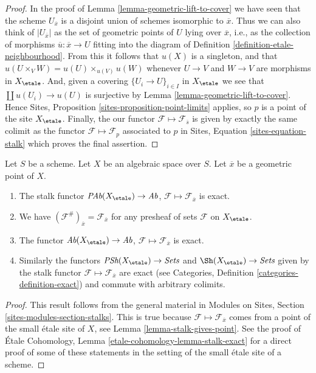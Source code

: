 \begin{proof}
In the proof of
Lemma \ref{lemma-geometric-lift-to-cover}
we have seen that the scheme $U_{\overline{x}}$ is a disjoint union of
schemes isomorphic to $\overline{x}$. Thus we can also think of
$|U_{\overline{x}}|$ as the set of geometric points of $U$ lying over
$\overline{x}$, i.e., as the collection of morphisms
$\overline{u} : \overline{x} \to U$ fitting into the diagram of
Definition \ref{definition-etale-neighbourhood}.
From this it follows that $u(X)$ is a singleton, and that
$u(U \times_V W) = u(U) \times_{u(V)} u(W)$
whenever $U \to V$ and $W \to V$ are morphisms in $X_\etale$.
And, given a covering $\{U_i \to U\}_{i \in I}$ in $X_\etale$ we see
that $\coprod u(U_i) \to u(U)$ is surjective by
Lemma \ref{lemma-geometric-lift-to-cover}.
Hence
Sites, Proposition \ref{sites-proposition-point-limits}
applies, so $p$ is a point of the site $X_\etale$.
Finally, the our functor $\mathcal{F} \mapsto \mathcal{F}_{\overline{s}}$
is given by exactly the same colimit as the functor
$\mathcal{F} \mapsto \mathcal{F}_p$ associated to $p$ in
Sites, Equation \ref{sites-equation-stalk}
which proves the final assertion.
\end{proof}

\begin{lemma}
\label{lemma-stalk-exact}
Let $S$ be a scheme.
Let $X$ be an algebraic space over $S$.
Let $\overline{x}$ be a geometric point of $X$.
\begin{enumerate}
\item The stalk functor
$\textit{PAb}(X_\etale) \to \textit{Ab}$,
$\mathcal{F}  \mapsto  \mathcal{F}_{\overline{x}}$
is exact.
\item We have $(\mathcal{F}^\#)_{\overline{x}} = \mathcal{F}_{\overline{x}}$
for any presheaf of sets $\mathcal{F}$ on $X_\etale$.
\item The functor
$\textit{Ab}(X_\etale) \to \textit{Ab}$,
$\mathcal{F} \mapsto \mathcal{F}_{\overline{x}}$ is exact.
\item Similarly the functors
$\textit{PSh}(X_\etale) \to \textit{Sets}$ and
$\Sh(X_\etale) \to \textit{Sets}$ given by the stalk functor
$\mathcal{F} \mapsto \mathcal{F}_{\overline{x}}$ are exact (see
Categories, Definition \ref{categories-definition-exact})
and commute with arbitrary colimits.
\end{enumerate}
\end{lemma}

\begin{proof}
This result follows from the general material in
Modules on Sites, Section \ref{sites-modules-section-stalks}.
This is true because $\mathcal{F} \mapsto \mathcal{F}_{\overline{x}}$
comes from a point of the small \'etale site of $X$, see
Lemma \ref{lemma-stalk-gives-point}. See the proof of
\'Etale Cohomology, Lemma \ref{etale-cohomology-lemma-stalk-exact}
for a direct proof of some of these statements in the setting of
the small \'etale site of a scheme.
\end{proof}


